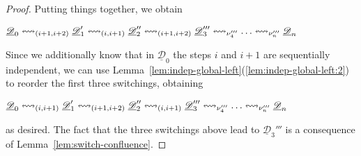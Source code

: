 \documentclass[a4paper,UKenglish,cleveref,pdftex,thm-restate,numberwithinsect]{lipics-v2021}
\newcommand{\dder}[1]{\mathscr{#1}}
\newcommand{\der}[1]{\underline{\dder{#1}}}
\newcommand{\shift}[1]{\ensuremath{\mathrel{{\leftrightsquigarrow}_{#1}}}}
\begin{document}
\begin{proof}
  Putting things together, we obtain
  \begin{center}
    $\der{D}_0 \shift{\transp{i+1}[i+2]} \der{D}_1' \shift{\transp{i}}
    \der{D}_2'' \shift{\transp{i+1}[i+2]} \der{D}_3''' \shift{\nu_4'''}\ldots \shift{\nu_n'''} \der{D}_n$
  \end{center}
  Since we additionally know that in $\der{D}_0$ the steps $i$ and
  $i+1$ are sequentially independent, we can use
  Lemma~\ref{lem:indep-global-left}(\ref{lem:indep-global-left:2}) to
  reorder the first three switchings, obtaining
  \begin{center}
    $\der{D}_0 \shift{\transp{i}} \der{D}_1' \shift{\transp{i+1}[i+2]}
    \der{D}_2'' \shift{\transp{i}} \der{D}_3''' \shift{\nu_4'''}\ldots \shift{\nu_n'''} \der{D}_n$
  \end{center}
  as desired.  The fact that the three switchings above lead to
  $\der{D}_3'''$ is a consequence of Lemma~\ref{lem:switch-confluence}.
\end{proof}
\end{document}
